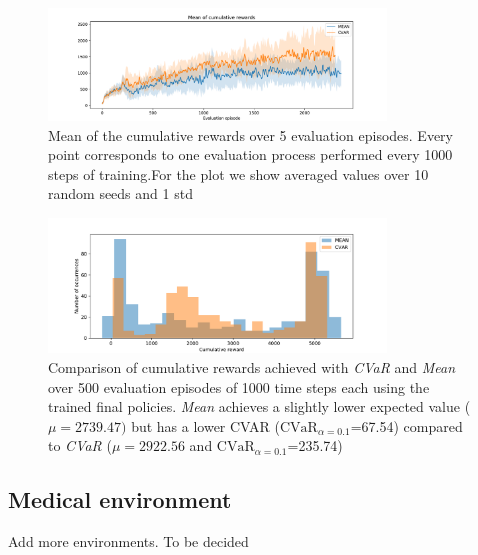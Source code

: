 \begin{figure}[ht]
\centering
\includegraphics[width=0.8\textwidth]{images/Walker_offpolicy_expert/mean_train_withstds.pdf}
\caption{Mean of the cumulative rewards over 5 evaluation episodes. Every point corresponds
to one evaluation process performed every 1000 steps of training.For the plot we
show averaged values over 10 random seeds and 1 std}
\label{mean_walker}

\end{figure}



\begin{figure}[ht]
\centering
\includegraphics[width=0.8\textwidth]{images/Walker_offpolicy_expert/hist_evaluation_numevalsteps1000.pdf}
\caption{Comparison of cumulative rewards achieved with \textit{CVaR} and \textit{Mean}
over 500 evaluation episodes of 1000 time steps each using the trained final policies.
\textit{Mean} achieves a slightly lower expected value ($\mu=2739.47)$ but 
has a lower CVAR ($\text{CVaR}_{\alpha= 0.1}$=67.54) compared to
\textit{CVaR} ($\mu=2922.56$ and $\text{CVaR}_{\alpha= 0.1}$=235.74)}
\label{hist_cum_rewards_walker}
\end{figure}

\clearpage
\subsection{Medical environment}
Add more environments. To be decided